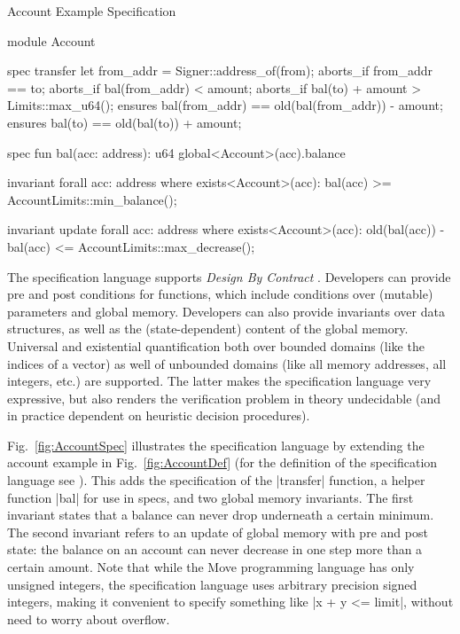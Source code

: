 \begin{Figure}
\caption{\label{fig:AccountSpec} Account Example Specification}
\begin{MoveBox}
module Account {
  spec transfer {
    let from_addr = Signer::address_of(from);
    aborts_if from_addr == to;
    aborts_if bal(from_addr) < amount;
    aborts_if bal(to) + amount > Limits::max_u64();
    ensures bal(from_addr) == old(bal(from_addr)) - amount;
    ensures bal(to) == old(bal(to)) + amount;
  }

  spec fun bal(acc: address): u64 {
    global<Account>(acc).balance
  }

  invariant forall acc: address where exists<Account>(acc):
    bal(acc) >= AccountLimits::min_balance();

  invariant update forall acc: address where exists<Account>(acc):
    old(bal(acc)) - bal(acc) <= AccountLimits::max_decrease();
}
\end{MoveBox}
\end{Figure}

\noindent The specification language supports {\em Design By Contract}
\cite{DESIGN_BY_CONTRACT}. Developers can provide pre and post conditions for
functions, which include conditions over (mutable) parameters and global
memory. Developers can also provide invariants over data structures, as well as
the (state-dependent) content of the global memory. Universal and existential
quantification both over bounded domains (like the indices of a vector) as well
of unbounded domains (like all memory addresses, all integers, etc.)  are
supported. The latter makes the specification language very expressive, but also
renders the verification problem in theory undecidable (and in practice
dependent on heuristic decision procedures).

Fig.~\ref{fig:AccountSpec} illustrates the specification language by extending
the account example in Fig.~\ref{fig:AccountDef} (for the definition of the
specification language see \cite{MOVE_SPEC_LANG_DEF}). This adds the
specification of the |transfer| function, a helper function |bal| for use in
specs, and two global memory invariants. The first invariant states that a
balance can never drop underneath a certain minimum. The second invariant refers
to an update of global memory with pre and post state: the balance on an account
can never decrease in one step more than a certain amount.  Note that while the
Move programming language has only unsigned integers, the specification language
uses arbitrary precision signed integers, making it convenient to specify
something like |x + y <= limit|, without need to worry about overflow.


